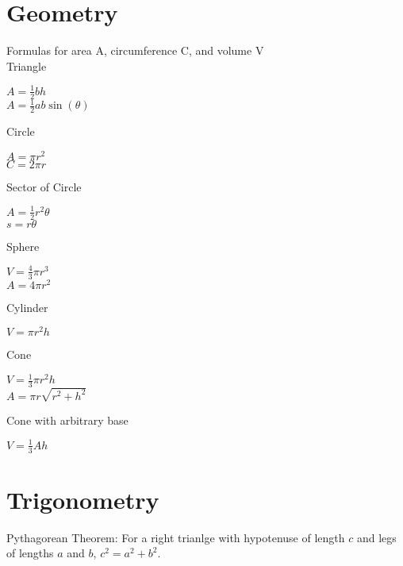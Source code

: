 \documentclass{article}
\begin{document}
\section* {Geometry}
	Formulas for area A, circumference C, and volume V\\
	Triangle\\
		\begin{center}
		$A = \frac{1}{2}bh$\\
		$A = \frac{1}{2}ab\sin(\theta)$\\
		\end{center}
	Circle\\
		\begin{center}
		$A = \pi r^2$\\
		$C = 2\pi r$\\
		\end{center}
	Sector of Circle\\
		\begin{center}
		$A = \frac{1}{2}r^2\theta$\\
		$s = r\theta$\\
		\end{center}
	Sphere\\
		\begin{center}
		$V = \frac{4}{3}\pi r^3$\\
		$A = 4\pi r^2$\\
		\end{center}
	Cylinder\\
		\begin{center}
		$V = \pi r^2h$\\
		\end{center}
	Cone\\
		\begin{center}
		$V = \frac{1}{3}\pi r^2h$\\
		$A = \pi r\sqrt{r^2 + h^2}$\\
		\end{center}
	Cone with arbitrary base\\
		\begin{center}
		$V = \frac{1}{3}Ah$\\
		\end{center}
		
\section* {Trigonometry}
	Pythagorean Theorem: For a right trianlge with hypotenuse of length $c$ and legs of lengths $a$ and $b$, $c^2 = a^2 + b^2$.\\
\end{document}
